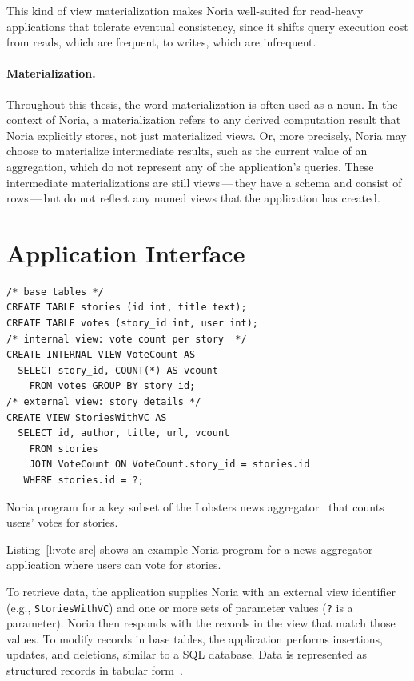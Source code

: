 This kind of view materialization makes Noria well-suited for read-heavy
applications that tolerate eventual consistency, since it shifts query execution
cost from reads, which are frequent, to writes, which are infrequent.

\paragraph{Materialization.}
Throughout this thesis, the word materialization is often used as a noun. In the
context of Noria, a materialization refers to any derived computation result
that Noria explicitly stores, not just materialized views. Or, more precisely,
Noria may choose to materialize intermediate results, such as the current value
of an aggregation, which do not represent any of the application's queries.
These intermediate materializations are still views\,---\,they have a schema and
consist of rows\,---\,but do not reflect any named views that the application
has created.

\section{Application Interface}

\begin{listing}[h]
  \begin{verbatim}
/* base tables */
CREATE TABLE stories (id int, title text);
CREATE TABLE votes (story_id int, user int);
/* internal view: vote count per story  */
CREATE INTERNAL VIEW VoteCount AS
  SELECT story_id, COUNT(*) AS vcount
    FROM votes GROUP BY story_id;
/* external view: story details */
CREATE VIEW StoriesWithVC AS
  SELECT id, author, title, url, vcount
    FROM stories
    JOIN VoteCount ON VoteCount.story_id = stories.id
   WHERE stories.id = ?;
  \end{verbatim}
  \caption{Noria program for a key subset of the Lobsters news
           aggregator~\cite{lobsters} that counts users' votes for stories.}
  \label{l:vote-src}
\end{listing}

Listing~\vref{l:vote-src} shows an example Noria program for a news aggregator
application where users can vote for stories.

To retrieve data, the application supplies Noria with an external view
identifier (e.g., \texttt{StoriesWithVC}) and one or more sets of parameter
values (\texttt{?} is a parameter). Noria then responds with the records in the
view that match those values. To modify records in base tables, the application
performs insertions, updates, and deletions, similar to a SQL database. Data is
represented as structured records in tabular form~\cite{spanner, bigtable}.

